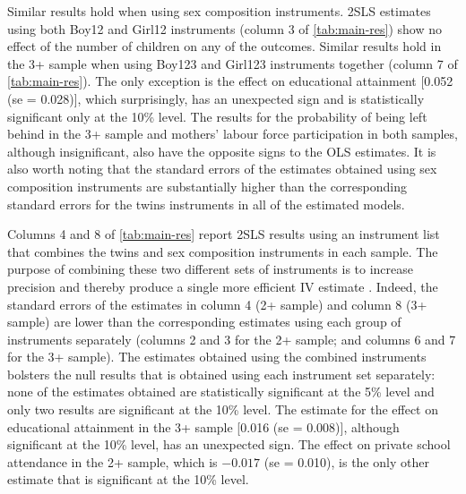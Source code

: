 Similar results hold when using sex composition instruments. 2SLS estimates using both Boy12 and Girl12 instruments (column 3 of \autoref{tab:main-res}) show no effect of the number of children on any of the outcomes. Similar results hold in the 3+ sample when using Boy123 and Girl123 instruments together (column 7 of \autoref{tab:main-res}). The only exception is the effect on educational attainment [0.052 (se = 0.028)], which surprisingly, has an unexpected sign and is statistically significant only at the 10\% level. The results for the probability of being left behind in the 3+ sample and mothers' labour force participation in both samples, although insignificant, also have the opposite signs to the OLS estimates. It is also worth noting that the standard errors of the estimates obtained using sex composition instruments are substantially higher than the corresponding standard errors for the twins instruments in all of the estimated models.

Columns 4 and 8 of \autoref{tab:main-res} report 2SLS results using an instrument list that combines the twins and sex composition instruments in each sample. The purpose of combining these two different sets of instruments is to increase precision and thereby produce a single more efficient IV estimate \parencite{angrist_multiple_2010}. Indeed, the standard errors of the estimates in column 4 (2+ sample) and column 8 (3+ sample) are lower than the corresponding estimates using each group of instruments separately (columns 2 and 3 for the 2+ sample; and columns 6 and 7 for the 3+ sample). The estimates obtained using the combined instruments bolsters the null results that is obtained using each instrument set separately: none of the estimates obtained are statistically significant at the 5\% level and only two results are significant at the 10\% level. The estimate for the effect on educational attainment in the 3+ sample [0.016 (se = 0.008)], although significant at the 10\% level, has an unexpected sign. The effect on private school attendance in the 2+ sample, which is $ -0.017 $ (se = 0.010), is the only other estimate that is significant at the 10\% level.

